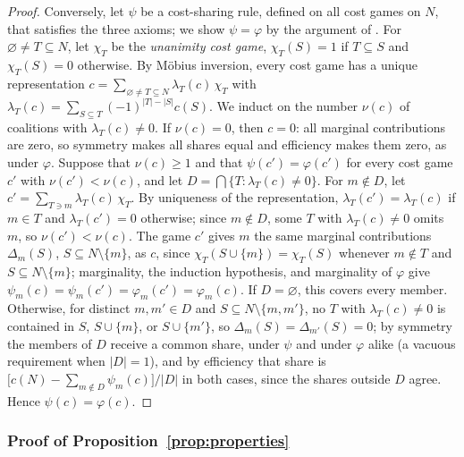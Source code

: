 \documentclass[11 pt]{article}
\begin{document}
\begin{proof}
Conversely, let $\psi$ be a cost-sharing rule, defined on all cost games on $N$, that satisfies the three axioms; we show $\psi = \varphi$ by the argument of \citet{young1985monotonic}. For $\varnothing \neq T \subseteq N$, let $\chi_{T}$ be the \emph{unanimity cost game}, $\chi_{T}(S) = 1$ if $T \subseteq S$ and $\chi_{T}(S) = 0$ otherwise. By M\"{o}bius inversion, every cost game has a unique representation $c = \sum_{\varnothing \neq T \subseteq N} \lambda_{T}(c)\, \chi_{T}$ with $\lambda_{T}(c) = \sum_{S \subseteq T} (-1)^{|T|-|S|} c(S)$. We induct on the number $\nu(c)$ of coalitions with $\lambda_{T}(c) \neq 0$. If $\nu(c) = 0$, then $c = 0$: all marginal contributions are zero, so symmetry makes all shares equal and efficiency makes them zero, as under $\varphi$. Suppose that $\nu(c) \geq 1$ and that $\psi(c') = \varphi(c')$ for every cost game $c'$ with $\nu(c') < \nu(c)$, and let $D = \bigcap \{ T : \lambda_{T}(c) \neq 0 \}$. For $m \notin D$, let $c' = \sum_{T \ni m} \lambda_{T}(c)\, \chi_{T}$. By uniqueness of the representation, $\lambda_{T}(c') = \lambda_{T}(c)$ if $m \in T$ and $\lambda_{T}(c') = 0$ otherwise; since $m \notin D$, some $T$ with $\lambda_{T}(c) \neq 0$ omits $m$, so $\nu(c') < \nu(c)$. The game $c'$ gives $m$ the same marginal contributions $\Delta_{m}(S)$, $S \subseteq N \setminus \{m\}$, as $c$, since $\chi_{T}(S \cup \{m\}) = \chi_{T}(S)$ whenever $m \notin T$ and $S \subseteq N \setminus \{m\}$; marginality, the induction hypothesis, and marginality of $\varphi$ give $\psi_{m}(c) = \psi_{m}(c') = \varphi_{m}(c') = \varphi_{m}(c)$. If $D = \varnothing$, this covers every member. Otherwise, for distinct $m, m' \in D$ and $S \subseteq N \setminus \{m,m'\}$, no $T$ with $\lambda_{T}(c) \neq 0$ is contained in $S$, $S \cup \{m\}$, or $S \cup \{m'\}$, so $\Delta_{m}(S) = \Delta_{m'}(S) = 0$; by symmetry the members of $D$ receive a common share, under $\psi$ and under $\varphi$ alike (a vacuous requirement when $|D| = 1$), and by efficiency that share is $\bigl[ c(N) - \sum_{m \notin D} \psi_{m}(c) \bigr] / |D|$ in both cases, since the shares outside $D$ agree. Hence $\psi(c) = \varphi(c)$.
\end{proof}

\subsubsection{Proof of Proposition~\ref{prop:properties}}\label{subsec:app_properties}
\end{document}
